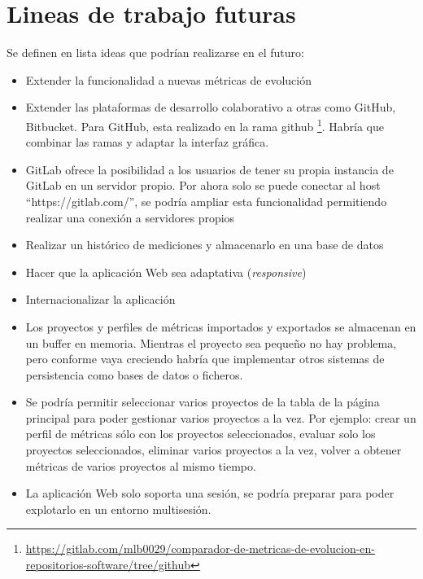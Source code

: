 \section{Lineas de trabajo futuras}

Se definen en lista ideas que podrían realizarse en el futuro:
\begin{itemize}
	\item Extender la funcionalidad a nuevas métricas de evolución
	\item Extender las plataformas de desarrollo colaborativo a otras como GitHub, Bitbucket. Para GitHub, esta realizado en la rama github \footnote{\url{https://gitlab.com/mlb0029/comparador-de-metricas-de-evolucion-en-repositorios-software/tree/github}}. Habría que combinar las ramas y adaptar la interfaz gráfica.
	\item GitLab ofrece la posibilidad a los usuarios de tener su propia instancia de GitLab en un servidor propio. Por ahora solo se puede conectar al host ``https://gitlab.com/'', se podría ampliar esta funcionalidad permitiendo realizar una conexión a servidores propios
	\item Realizar un histórico de mediciones y almacenarlo en una base de datos
	\item Hacer que la aplicación Web sea adaptativa (\textit{responsive})
	\item Internacionalizar la aplicación
	\item Los proyectos y perfiles de métricas importados y exportados se almacenan en un buffer en memoria. Mientras el proyecto sea pequeño no hay problema, pero conforme vaya creciendo habría que implementar otros sistemas de persistencia como bases de datos o ficheros.
	\item Se podría permitir seleccionar varios proyectos de la tabla de la página principal para poder gestionar varios proyectos a la vez. Por ejemplo: crear un perfil de métricas sólo con los proyectos seleccionados, evaluar solo los proyectos seleccionados, eliminar varios proyectos a la vez, volver a obtener métricas de varios proyectos al mismo tiempo.
	\item La aplicación Web solo soporta una sesión, se podría preparar para poder explotarlo en un entorno multisesión.
\end{itemize}